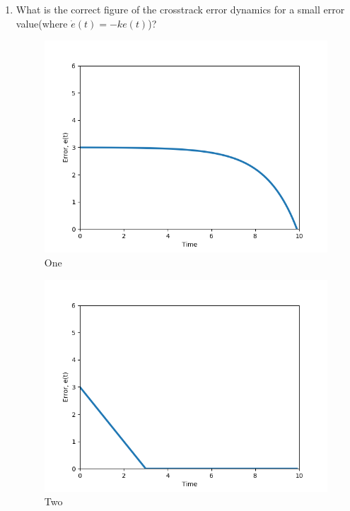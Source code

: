 \begin{enumerate}
\item What is the correct figure of the crosstrack error dynamics for a small error value(where $\dot{e}(t)=−ke(t)$)?
\begin{figure}[!htb]
\begin{center}
\includegraphics[scale=0.280]{img/lateral_control/error_incorrect3.png}
\end{center}
\caption{One}
\label{error_incorrect3}
\end{figure}
\begin{figure}[!htb]
\begin{center}
\includegraphics[scale=0.280]{img/lateral_control/error_incorrect2.png}
\end{center}
\caption{Two}

\end{figure}
\end{enumerate}
